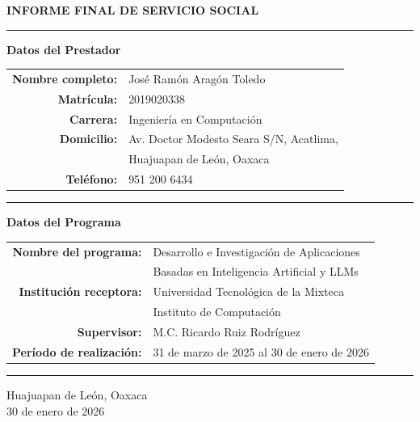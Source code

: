 \documentclass[12pt,letterpaper]{article}
\begin{document}
\begin{titlepage}
    \centering
    \vspace*{1cm}
    
    {\LARGE \textbf{INFORME FINAL DE SERVICIO SOCIAL}}
    
    \vspace{2cm}
    
    \hrule
    \vspace{0.8cm}
    
    {\Large \textbf{Datos del Prestador}}
    
    \vspace{0.5cm}
    
    \begin{tabular}{rl}
        \textbf{Nombre completo:} & José Ramón Aragón Toledo \\[0.3cm]
        \textbf{Matrícula:} & 2019020338 \\[0.3cm]
        \textbf{Carrera:} & Ingeniería en Computación \\[0.3cm]
        \textbf{Domicilio:} & Av. Doctor Modesto Seara S/N, Acatlima, \\
        & Huajuapan de León, Oaxaca \\[0.3cm]
        \textbf{Teléfono:} & 951 200 6434 \\
    \end{tabular}
    
    \vspace{1cm}
    \hrule
    \vspace{0.8cm}
    
    {\Large \textbf{Datos del Programa}}
    
    \vspace{0.5cm}
    
    \begin{tabular}{rl}
        \textbf{Nombre del programa:} & Desarrollo e Investigación de Aplicaciones \\
        & Basadas en Inteligencia Artificial y LLMs \\[0.3cm]
        \textbf{Institución receptora:} & Universidad Tecnológica de la Mixteca \\
        & Instituto de Computación \\[0.3cm]
        \textbf{Supervisor:} & M.C. Ricardo Ruiz Rodríguez \\[0.3cm]
        \textbf{Período de realización:} & 31 de marzo de 2025 al 30 de enero de 2026 \\
    \end{tabular}
    
    \vspace{1.5cm}
    \hrule
    
    \vfill
    
    {\large Huajuapan de León, Oaxaca}\\[0.3cm]
    {\large 30 de enero de 2026}
    
\end{titlepage}
\end{document}
